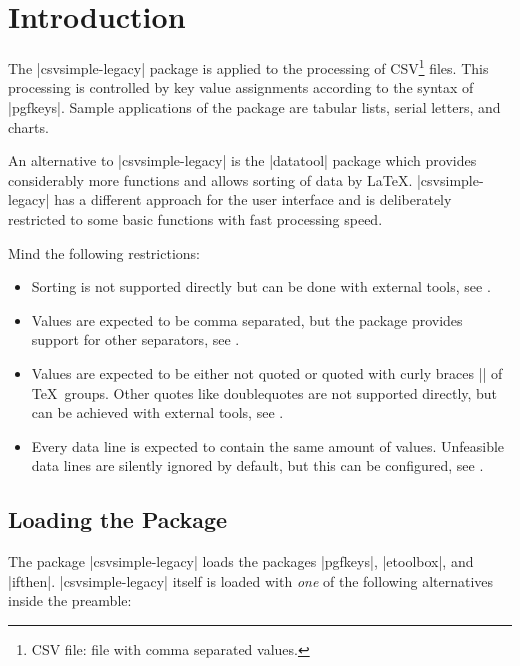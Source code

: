 \documentclass[a4paper,11pt]{ltxdoc}
\begin{document}
\clearpage
\tableofcontents

\clearpage
\section{Introduction}%
The |csvsimple-legacy| package is applied to the processing of
CSV\footnote{CSV file: file with comma separated values.} files.
This processing is controlled by key value assignments according to the
syntax of |pgfkeys|. Sample applications of the package
are tabular lists, serial letters, and charts.

An alternative to |csvsimple-legacy| is the |datatool| package
which provides considerably more functions and allows sorting of data by \LaTeX.
|csvsimple-legacy| has a different approach for the user interface and
is deliberately restricted to some basic functions with fast
processing speed.

Mind the following restrictions:
\begin{itemize}
\item Sorting is not supported directly but can be done
  with external tools, see .
\item Values are expected to be comma separated, but the package
  provides support for other separators, see .
\item Values are expected to be either not quoted or quoted with
  curly braces |{}| of \TeX\ groups. Other quotes like doublequotes
  are not supported directly, but can be achieved
  with external tools, see .
\item Every data line is expected to contain the same amount of values.
  Unfeasible data lines are silently ignored by default, but this can
  be configured, see .
\end{itemize}


\subsection{Loading the Package}
The package |csvsimple-legacy| loads the packages
|pgfkeys|,
|etoolbox|,
and |ifthen|.
|csvsimple-legacy| itself is loaded with \emph{one} of the following
alternatives inside the preamble:
\begin{dispListing}
\usepackage{csvsimple}
\usepackage[legacy]{csvsimple}
\usepackage{csvsimple-legacy}
\end{dispListing}
\end{document}
